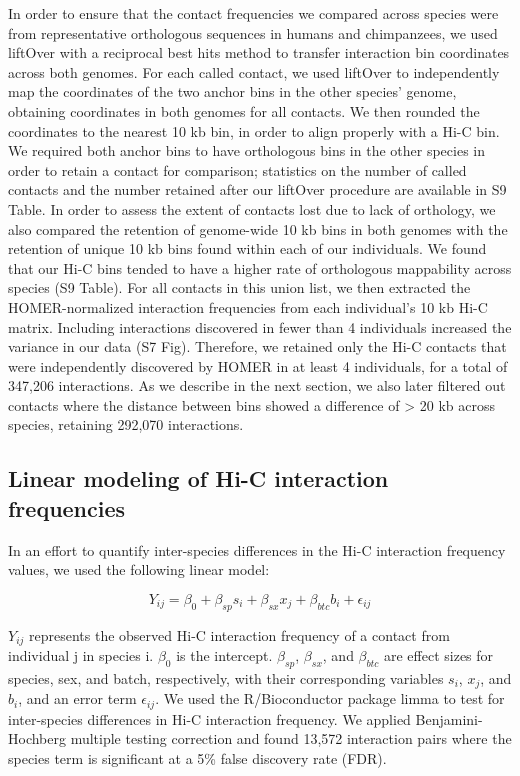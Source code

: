 In order to ensure that the contact frequencies we compared across species were from representative orthologous sequences in humans and chimpanzees, we used liftOver with a reciprocal best hits method \cite{Ward.2014, Kent.2002} to transfer interaction bin coordinates across both genomes. For each called contact, we used liftOver to independently map the coordinates of the two anchor bins in the other species' genome, obtaining coordinates in both genomes for all contacts. We then rounded the coordinates to the nearest 10 kb bin, in order to align properly with a Hi-C bin. We required both anchor bins to have orthologous bins in the other species in order to retain a contact for comparison; statistics on the number of called contacts and the number retained after our liftOver procedure are available in S9 Table. In order to assess the extent of contacts lost due to lack of orthology, we also compared the retention of genome-wide 10 kb bins in both genomes with the retention of unique 10 kb bins found within each of our individuals. We found that our Hi-C bins tended to have a higher rate of orthologous mappability across species (S9 Table). For all contacts in this union list, we then extracted the HOMER-normalized interaction frequencies from each individual's 10 kb Hi-C matrix. Including interactions discovered in fewer than 4 individuals increased the variance in our data (S7 Fig). Therefore, we retained only the Hi-C contacts that were independently discovered by HOMER in at least 4 individuals, for a total of 347,206 interactions. As we describe in the next section, we also later filtered out contacts where the distance between bins showed a difference of {\textgreater} 20 kb across species, retaining 292,070 interactions.

\subsection{Linear modeling of Hi-C interaction frequencies}

In an effort to quantify inter-species differences in the Hi-C interaction frequency values, we used the following linear model:

\begin{equation} \label{eq:limma}
Y_{ij} = \beta_{0} + \beta_{sp}s_{i} + \beta_{sx}x_{j} + \beta_{btc}b_{i} + \epsilon_{ij}
\end{equation}

$Y_{ij}$ represents the observed Hi-C interaction frequency of a contact from individual j in species i. $\beta_{0}$ is the intercept. $\beta_{sp}$, $\beta_{sx}$, and $\beta_{btc}$ are effect sizes for species, sex, and batch, respectively, with their corresponding variables $s_{i}$, $x_{j}$, and $b_{i}$, and an error term $\epsilon_{ij}$. We used the R/Bioconductor package limma \cite{Smyth.2004, Law.2014} to test for inter-species differences in Hi-C interaction frequency. We applied Benjamini-Hochberg multiple testing correction and found 13,572 interaction pairs where the species term is significant at a 5\% false discovery rate (FDR).

